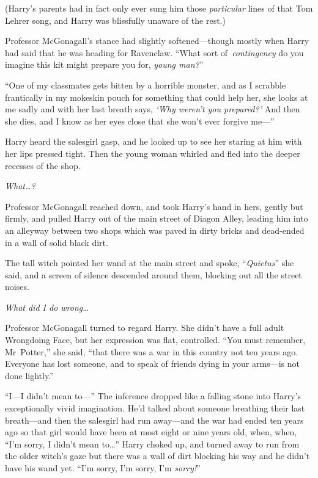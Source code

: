 (Harry’s parents had in fact only ever sung him those \emph{particular} lines of that Tom Lehrer song, and Harry was blissfully unaware of the rest.)

Professor McGonagall’s stance had slightly softened—though mostly when Harry had said that he was heading for Ravenclaw. “What sort of\linebreak\ \emph{contingency} do you imagine this kit might prepare you for, \emph{young man?}”

“One of my classmates gets bitten by a horrible monster, and as I scrabble frantically in my mokeskin pouch for something that could help her, she looks at me sadly and with her last breath says, \emph{‘Why weren’t you prepared?’} And then she dies, and I know as her eyes close that she won’t ever forgive me—”

Harry heard the salesgirl gasp, and he looked up to see her staring at him with her lips pressed tight. Then the young woman whirled and fled into the deeper recesses of the shop.

\emph{What…?}

Professor McGonagall reached down, and took Harry’s hand in hers, gently but firmly, and pulled Harry out of the main street of Diagon Alley, leading him into an alleyway between two shops which was paved in dirty bricks and dead-ended in a wall of solid black dirt.

The tall witch pointed her wand at the main street and spoke, “\emph{Quietus}” she said, and a screen of silence descended around them, blocking out all the street noises.

\emph{What did I do wrong…}

Professor McGonagall turned to regard Harry. She didn’t have a full adult Wrongdoing Face, but her expression was flat, controlled. “You must remember, Mr~Potter,” she said, “that there was a war in this country not ten years ago. Everyone has lost someone, and to speak of friends dying in your arms—is not done lightly.”

“I—I didn’t mean to—” The inference dropped like a falling stone into Harry’s exceptionally vivid imagination. He’d talked about someone breathing their last breath—and then the salesgirl had run away—and the war had ended ten years ago so that girl would have been at most eight or nine years old, when, when, “I’m sorry, I didn’t mean to…” Harry choked up, and turned away to run from the older witch’s gaze but there was a wall of dirt blocking his way and he didn’t have his wand yet. “I’m sorry, I’m sorry, I’m \emph{sorry!}”

